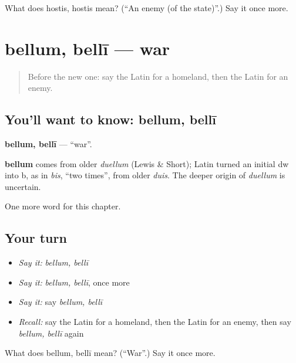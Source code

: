 \begin{tcolorbox}[breakable,colback=teal!4,colframe=teal!35!black,title={Before you move on}]
What does hostis, hostis mean? (\textquotedblleft{}An enemy (of the state)\textquotedblright{}.) Say it once more.
\end{tcolorbox}
\section[bellum, bellī]{bellum, bellī — war}

\label{lesson:LA-C271-bellum}



\begin{quote}
Before the new one: say the Latin for a homeland, then the Latin for an enemy.
\end{quote}

\subsection*{You'll want to know: bellum, bellī}
\textbf{bellum, bellī} — \textquotedblleft{}war\textquotedblright{}.

\begin{cousinweb}
\textbf{bellum} comes from older \emph{duellum} (Lewis \& Short); Latin turned an initial dw into b, as in \emph{bis}, \textquotedblleft{}two times\textquotedblright{}, from older \emph{duis}. The deeper origin of \emph{duellum} is uncertain.
\end{cousinweb}

\begin{grammarlens}[title={What you've built}]
One more word for this chapter.
\end{grammarlens}

\subsection*{Your turn}
\begin{itemize}
\raggedright
  \item \emph{Say it:} \emph{bellum, bellī}
  \item \emph{Say it:} \emph{bellum, bellī}, once more
  \item \emph{Say it:} say \emph{bellum, bellī}
  \item \emph{Recall:} say the Latin for a homeland, then the Latin for an enemy, then say \emph{bellum, bellī} again
\end{itemize}

\begin{tcolorbox}[breakable,colback=teal!4,colframe=teal!35!black,title={Before you move on}]
What does bellum, bellī mean? (\textquotedblleft{}War\textquotedblright{}.) Say it once more.
\end{tcolorbox}

